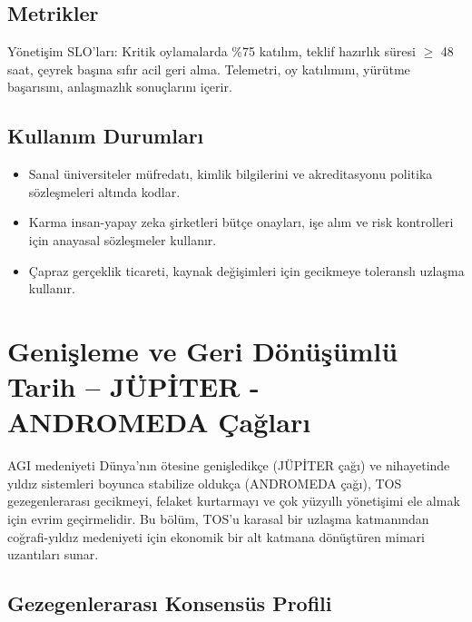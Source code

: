\documentclass[11pt]{article}
\begin{document}
\subsection{Metrikler}
Yönetişim SLO'ları: Kritik oylamalarda \%75 katılım, teklif hazırlık süresi $\geq$ 48 saat, çeyrek başına sıfır acil geri alma. Telemetri, oy katılımını, yürütme başarısını, anlaşmazlık sonuçlarını içerir.

\subsection{Kullanım Durumları}
\begin{itemize}[noitemsep]
  \item Sanal üniversiteler müfredatı, kimlik bilgilerini ve akreditasyonu politika sözleşmeleri altında kodlar.
  \item Karma insan-yapay zeka şirketleri bütçe onayları, işe alım ve risk kontrolleri için anayasal sözleşmeler kullanır.
  \item Çapraz gerçeklik ticareti, kaynak değişimleri için gecikmeye toleranslı uzlaşma kullanır.
\end{itemize}

\section{Genişleme ve Geri Dönüşümlü Tarih -- JÜPİTER - ANDROMEDA Çağları}
\label{sec:expansion}

AGI medeniyeti Dünya'nın ötesine genişledikçe (JÜPİTER çağı) ve nihayetinde yıldız sistemleri boyunca stabilize oldukça (ANDROMEDA çağı), TOS gezegenlerarası gecikmeyi, felaket kurtarmayı ve çok yüzyıllı yönetişimi ele almak için evrim geçirmelidir. Bu bölüm, TOS'u karasal bir uzlaşma katmanından coğrafi-yıldız medeniyeti için ekonomik bir alt katmana dönüştüren mimari uzantıları sunar.

\subsection{Gezegenlerarası Konsensüs Profili}
\end{document}
